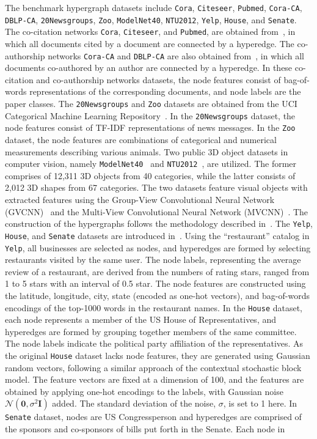 \documentclass[review]{elsarticle}
\begin{document}
The benchmark hypergraph datasets include \texttt{Cora}, \texttt{Citeseer}, \texttt{Pubmed}, \texttt{Cora-CA}, \texttt{DBLP-CA}, \texttt{20Newsgroups}, \texttt{Zoo}, \texttt{ModelNet40}, \texttt{NTU2012}, \texttt{Yelp}, \texttt{House}, and \texttt{Senate}. The co-citation networks \texttt{Cora}, \texttt{Citeseer}, and \texttt{Pubmed}, are obtained from~\cite{yadati2019hypergcn}, in which all documents cited by a document are connected by a hyperedge. The co-authorship networks \texttt{Cora-CA} and \texttt{DBLP-CA} are also obtained from~\cite{yadati2019hypergcn}, in which all documents co-authored by an author are connected by a hyperedge. In these co-citation and co-authorship networks datasets, the node features consist of bag-of-words representations of the corresponding documents, and node labels are the paper classes. The \texttt{20Newsgroups} and \texttt{Zoo} datasets are obtained from the UCI Categorical Machine Learning Repository~\cite{asuncion2007uci}. In the \texttt{20Newsgroups} dataset, the node features consist of TF-IDF representations of news messages. In the \texttt{Zoo} dataset, the node features are combinations of categorical and numerical measurements describing various animals. Two public 3D object datasets in computer vision, namely \texttt{ModelNet40}~\cite{wu20153d} and \texttt{NTU2012}~\cite{chen2003visual}, are utilized. The former comprises of 12,311 3D objects from 40 categories, while the latter consists of 2,012 3D shapes from 67 categories. The two datasets feature visual objects with extracted features using the Group-View Convolutional Neural Network (GVCNN)~\cite{feng2018gvcnn} and the Multi-View Convolutional Neural Network (MVCNN)~\cite{su2015multi}. The construction of the hypergraphs follows the methodology described in~\cite{feng2019hypergraph,yang2022semi}. The \texttt{Yelp}, \texttt{House}, and \texttt{Senate} datasets are introduced in~\cite{chien2021you,fowler2006legislative}. Using the ``restaurant'' catalog in \texttt{Yelp}, all businesses are selected as nodes, and hyperedges are formed by selecting restaurants visited by the same user. The node labels, representing the average review of a restaurant, are derived from the numbers of rating stars, ranged from 1 to 5 stars with an interval of 0.5 star. The node features are constructed using the latitude, longitude, city, state (encoded as one-hot vectors), and bag-of-words encodings of the top-1000 words in the restaurant names. In the \texttt{House} dataset, each node represents a member of the US House of Representatives, and hyperedges are formed by grouping together members of the same committee. The node labels indicate the political party affiliation of the representatives. As the original \texttt{House} dataset lacks node features, they are generated using Gaussian random vectors, following a similar approach of the contextual stochastic block model. The feature vectors are fixed at a dimension of 100, and the features are obtained by applying one-hot encodings to the labels, with Gaussian noise $\mathcal{N}(\mathbf{0},\sigma^2\mathbf{I})$ added. The standard deviation of the noise, $\sigma$, is set to 1 here. In \texttt{Senate} dataset, nodes are US Congressperson and hyperedges are comprised of the sponsors and co-sponsors of bills put forth in the Senate. Each node in 
\end{document}
